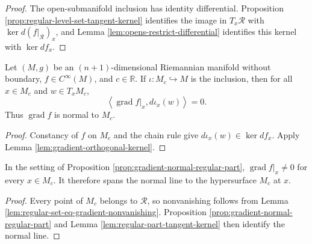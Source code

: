 \begin{proof}

\sketch The open-submanifold inclusion has identity differential. Proposition
\ref{prop:regular-level-set-tangent-kernel} identifies the image in $T_x\mathcal R$
with $\ker d(f|_{\mathcal R})_x$, and Lemma
\ref{lem:opens-restrict-differential} identifies this kernel with $\ker df_x$.
\end{proof}

\begin{proposition}
\label{prop:gradient-normal-regular-part}





Let $(M,g)$ be an $(n+1)$-dimensional Riemannian manifold without boundary,
$f\in C^\infty(M)$, and $c\in\mathbb R$. If $\iota\colon M_c\hookrightarrow M$ is
the inclusion, then for all $x\in M_c$ and $w\in T_xM_c$,
\[
\left\langle\operatorname{grad}f|_x,d\iota_x(w)\right\rangle=0.
\]
Thus $\operatorname{grad}f$ is normal to $M_c$.
\end{proposition}

\begin{proof}

\sketch Constancy of $f$ on $M_c$ and the chain rule give
$d\iota_x(w)\in\ker df_x$. Apply Lemma
\ref{lem:gradient-orthogonal-kernel}.
\end{proof}

\begin{lemma}
\label{lem:gradient-nonvanishing-regular-part}





In the setting of Proposition \ref{prop:gradient-normal-regular-part},
$\operatorname{grad}f|_x\ne0$ for every $x\in M_c$. It therefore spans the normal
line to the hypersurface $M_c$ at $x$.
\end{lemma}

\begin{proof}

\sketch Every point of $M_c$ belongs to $\mathcal R$, so nonvanishing follows from
Lemma \ref{lem:regular-set-eq-gradient-nonvanishing}. Proposition
\ref{prop:gradient-normal-regular-part} and Lemma
\ref{lem:regular-part-tangent-kernel} then identify the normal line.
\end{proof}


